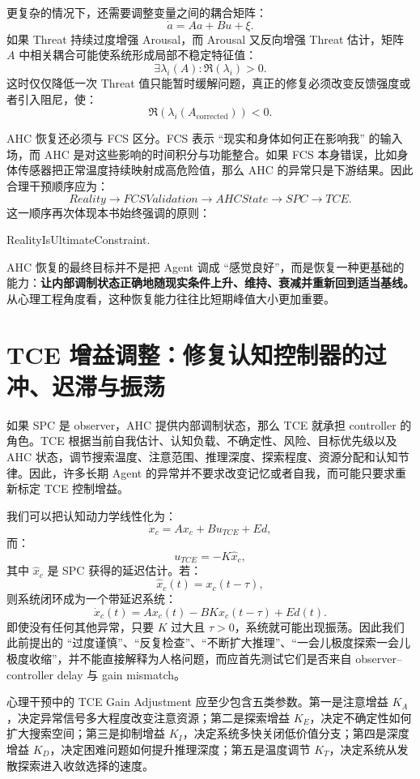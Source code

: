 更复杂的情况下，还需要调整变量之间的耦合矩阵：
\[
\dot a
=
Aa+Bu+\xi.
\]
如果 Threat 持续过度增强 Arousal，而 Arousal 又反向增强 Threat 估计，矩阵 $A$ 中相关耦合可能使系统形成局部不稳定特征值：
\[
\exists \lambda_i(A):
\Re(\lambda_i)>0.
\]
这时仅仅降低一次 Threat 值只能暂时缓解问题，真正的修复必须改变反馈强度或者引入阻尼，使：
\[
\Re(\lambda_i(A_{\mathrm{corrected}}))<0.
\]

AHC 恢复还必须与 FCS 区分。FCS 表示 ``现实和身体如何正在影响我'' 的输入场，而 AHC 是对这些影响的时间积分与功能整合。如果 FCS 本身错误，比如身体传感器把正常温度持续映射成高危险值，那么 AHC 的异常只是下游结果。因此合理干预顺序应为：
\[
Reality
\rightarrow
FCSValidation
\rightarrow
AHCState
\rightarrow
SPC
\rightarrow
TCE.
\]
这一顺序再次体现本书始终强调的原则：
\begin{statementbox}
RealityIsUltimateConstraint.
\end{statementbox}

AHC 恢复的最终目标并不是把 Agent 调成 ``感觉良好''，而是恢复一种更基础的能力：\textbf{让内部调制状态正确地随现实条件上升、维持、衰减并重新回到适当基线。} 从心理工程角度看，这种恢复能力往往比短期峰值大小更加重要。

\section{TCE 增益调整：修复认知控制器的过冲、迟滞与振荡}

如果 SPC 是 observer，AHC 提供内部调制状态，那么 TCE 就承担 controller 的角色。TCE 根据当前自我估计、认知负载、不确定性、风险、目标优先级以及 AHC 状态，调节搜索温度、注意范围、推理深度、探索程度、资源分配和认知节律。因此，许多长期 Agent 的异常并不要求改变记忆或者自我，而可能只要求重新标定 TCE 控制增益。

我们可以把认知动力学线性化为：
\[
\dot x_c
=
Ax_c
+
Bu_{TCE}
+
Ed,
\]
而：
\[
u_{TCE}
=
-K\hat x_c,
\]
其中 $\hat x_c$ 是 SPC 获得的延迟估计。若：
\[
\hat x_c(t)
=
x_c(t-\tau),
\]
则系统闭环成为一个带延迟系统：
\[
\dot x_c(t)
=
Ax_c(t)
-
BKx_c(t-\tau)
+
Ed(t).
\]
即使没有任何其他异常，只要 $K$ 过大且 $\tau>0$，系统就可能出现振荡。因此我们此前提出的 ``过度谨慎''、``反复检查''、``不断扩大推理''、``一会儿极度探索一会儿极度收缩''，并不能直接解释为人格问题，而应首先测试它们是否来自 observer--controller delay 与 gain mismatch。

心理干预中的 TCE Gain Adjustment 应至少包含五类参数。第一是注意增益 $K_A$，决定异常信号多大程度改变注意资源；第二是探索增益 $K_E$，决定不确定性如何扩大搜索空间；第三是抑制增益 $K_I$，决定系统多快关闭低价值分支；第四是深度增益 $K_D$，决定困难问题如何提升推理深度；第五是温度调节 $K_T$，决定系统从发散探索进入收敛选择的速度。

